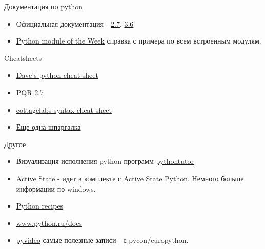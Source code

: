 \documentclass{article}
\begin{document}
\LARGE

\begin{center} Документация по python \end{center}
\begin{itemize}
	\item Официальная документация - \href{http://docs.python.org/2.7/}{2.7}, 
			\href{http://docs.python.org/3.6/}{3.6}
	\item \href{http://www.doughellmann.com/PyMOTW/}{Python module of the Week} 
		  справка с примера по всем встроенным модулям.
\end{itemize}

\begin{center} Cheatsheets \end{center}
\begin{itemize}
	\item \href{http://www.addedbytes.com/cheat-sheets/python-cheat-sheet/}{Dave's python cheat sheet} 
	\item \href{http://rgruet.free.fr/PQR27/PQR2.7_printing_a4.pdf}{PQR 2.7} 
	\item \href{http://cottagelabs.com/news/python-language-syntax-cheat-sheet}{cottagelabs syntax cheat sheet}
	\item \href{http://cheatography.com/sschaub/cheat-sheets/essential-python/}{Еще одна шпаргалка}
\end{itemize}

\begin{center} Другое \end{center}
\begin{itemize}
	\item Визуализация исполнения python программ 
			\href{http://www.pythontutor.com/visualize.html}{pythontutor}
	\item \href{http://www.activestate.com/activepython}{Active State} - идет в комплекте
	      с Active State Python. Немного больше информации по windows. 
	\item \href{http://code.activestate.com/recipes/langs/python/}{Python recipes}
	\item \href{http://www.python.ru/docs/}{www.python.ru/docs}
	\item \href{http://pyvideo.org/}{pyvideo} самые полезные записи - с pycon/europython.
\end{itemize}

\end{document}
